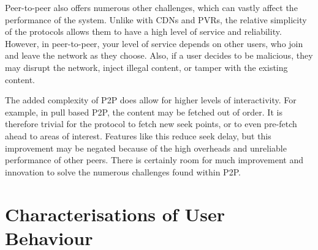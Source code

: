     Peer-to-peer also offers numerous other challenges, which can vastly affect the performance of the system. Unlike with CDNs and PVRs, the relative simplicity of the protocols allows them to have a high level of service and reliability. However, in peer-to-peer, your level of service depends on other users, who join and leave the network as they choose. Also, if a user decides to be malicious, they may disrupt the network, inject illegal content, or tamper with the existing content.

    The added complexity of P2P does allow for higher levels of interactivity. For example, in pull based P2P, the content may be fetched out of order.  It is therefore trivial for the protocol to fetch new seek points, or to even pre-fetch ahead to areas of interest. Features like this reduce seek delay, but this improvement may be negated because of the high overheads and unreliable performance of other peers. There is certainly room for much improvement and innovation to solve the numerous challenges found within P2P.


%


\section{Characterisations of User Behaviour}
\label{sect:characterisations}





